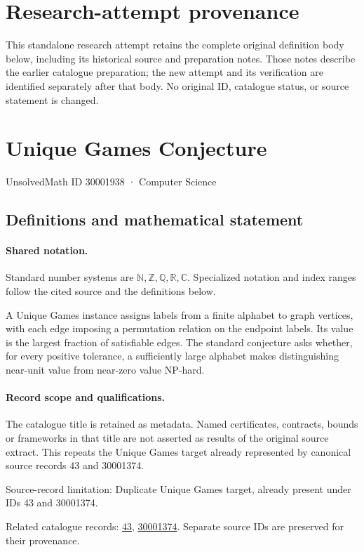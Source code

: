 \documentclass[11pt]{article}
\begin{document}
\section*{Research-attempt provenance}
This standalone research attempt retains the complete original definition body below,
including its historical source and preparation notes. Those notes describe the
earlier catalogue preparation; the new attempt and its verification are identified
separately after that body. No original ID, catalogue status, or source statement is changed.

\section{Unique Games Conjecture}\label{30001938}
{\small UnsolvedMath ID 30001938 · Computer Science}
\subsection{Definitions and mathematical statement}

\paragraph{Shared notation.}Standard number systems are $\mathbb N,\mathbb Z,\mathbb Q,\mathbb R,\mathbb C$. Specialized notation and index ranges follow the cited source and the definitions below.


A Unique Games instance assigns labels from a finite alphabet to graph vertices, with each edge imposing a permutation relation on the endpoint labels. Its value is the largest fraction of satisfiable edges. The standard conjecture asks whether, for every positive tolerance, a sufficiently large alphabet makes distinguishing near-unit value from near-zero value NP-hard.
\paragraph{Record scope and qualifications.}
The catalogue title is retained as metadata. Named certificates, contracts, bounds or frameworks in that title are not asserted as results of the original source extract.
This repeats the Unique Games target already represented by canonical source records 43 and 30001374.

Source-record limitation: Duplicate Unique Games target, already present under IDs 43 and 30001374.

Related catalogue records: \href{https://mehmetmars7.github.io/Erdosproblems-llm-hunter/problem.html?type=open_problems&id=43}{43}, \href{https://mehmetmars7.github.io/Erdosproblems-llm-hunter/problem.html?type=open_problems&id=30001374}{30001374}. Separate source IDs are preserved for their provenance.
\end{document}
